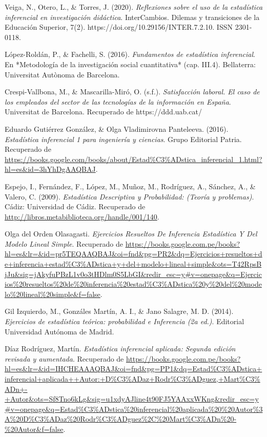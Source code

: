 \begin{thebibliography}{9}

  Veiga, N., Otero, L., \& Torres, J. (2020). \textit{Reflexiones sobre el uso de la estadística inferencial en investigación didáctica}. InterCambios. Dilemas y transiciones de la Educación Superior, 7(2). https://doi.org/10.29156/INTER.7.2.10. ISSN 2301-0118.

  
  López-Roldán, P., \& Fachelli, S. (2016). \textit{Fundamentos de estadística inferencial}. En *Metodología de la investigación social cuantitativa* (cap. III.4). Bellaterra: Universitat Autònoma de Barcelona.

  Crespi-Vallbona, M., \& Mascarilla-Miró, O. (s.f.). \textit{Satisfacción laboral. El caso de los empleados del sector de las tecnologías de la información en España}. Universitat de Barcelona. Recuperado de https://ddd.uab.cat/

  Eduardo Gutiérrez González, \& Olga Vladimirovna Panteleeva. (2016). \textit{Estadística inferencial 1 para ingeniería y ciencias}. Grupo Editorial Patria. Recuperado de \url{https://books.google.com/books/about/Estad%C3%ADstica_inferencial_1.html?hl=es&id=3hYhDgAAQBAJ}.

  Espejo, I., Fernández, F., López, M., Muñoz, M., Rodríguez, A., Sánchez, A., \& Valero, C. (2009). \textit{Estadística Descriptiva y Probabilidad: (Teoría y problemas)}. Cádiz: Universidad de Cádiz. Recuperado de \url{http://libros.metabiblioteca.org/handle/001/140}.

  Olga del Orden Olasagasti. \textit{Ejercicios Resueltos De Inferencia Estadística Y Del Modelo Lineal Simple}. Recuperado de \url{https://books.google.com.pe/books?hl=es&lr=&id=pr5TEQAAQBAJ&oi=fnd&pg=PR2&dq=Ejercicios+resueltos+de+inferencia+estad%C3%ADstica+y+del+modelo+lineal+simple&ots=T42RpsBjJu&sig=jAkyfuPBzL1v0o3tHDlm0S5LbGI&redir_esc=y#v=onepage&q=Ejercicios%20resueltos%20de%20inferencia%20estad%C3%ADstica%20y%20del%20modelo%20lineal%20simple&f=false}.

  Gil Izquierdo, M., Gonzáles Martín, A. I., \& Jano Salagre, M. D. (2014). \textit{Ejercicios de estadística teórica: probabilidad e Inferencia (2a ed.)}. Editorial Universidad Autónoma de Madrid.

  Díaz Rodríguez, Martín. \textit{Estadística inferencial aplicada: Segunda edición revisada y aumentada}. Recuperado de \url{https://books.google.com.pe/books?hl=es&lr=&id=IHCHEAAAQBAJ&oi=fnd&pg=PP1&dq=Estad%C3%ADstica+inferencial+aplicada++Autor:+D%C3%ADaz+Rodr%C3%ADguez,+Mart%C3%ADn+-+Autor&ots=Sf8Tno6kLg&sig=u1xdyAJline4t90FJ5YAAxxWKng&redir_esc=y#v=onepage&q=Estad%C3%ADstica%20inferencial%20aplicada%20%20Autor%3A%20D%C3%ADaz%20Rodr%C3%ADguez%2C%20Mart%C3%ADn%20-%20Autor&f=false}.


\end{thebibliography}
